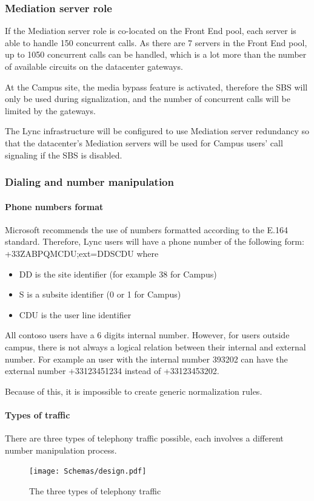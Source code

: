 \subsubsection{Mediation server role}
If the Mediation server role is co-located on the Front End pool, each server is able to handle 150 concurrent calls. As there are 7 servers in the Front End pool, up to 1050 concurrent calls can be handled, which is a lot more than the number of available circuits on the datacenter gateways.

At the Campus site, the media bypass feature is activated, therefore the SBS will only be used during signalization, and the number of concurrent calls will be limited by the gateways.

The Lync infrastructure will be configured to use Mediation server redundancy so that the datacenter's Mediation servers will be used for Campus users' call signaling if the SBS is disabled.

\subsubsection{Dialing and number manipulation}
	\paragraph{Phone numbers format}
	Microsoft recommends the use of numbers formatted according to the E.164 standard. Therefore, Lync users will have a phone number of the following form: +33ZABPQMCDU;ext=DDSCDU where
	\begin{itemize}
		\item DD is the site identifier (for example 38 for Campus)
		\item S is a subsite identifier (0 or 1 for Campus)
		\item CDU is the user line identifier
	\end{itemize}
	
	All contoso users have a 6 digits internal number. However, for users outside campus, there is not always a logical relation between their internal and external number. For example an user with the internal number 393202 can have the external number +33123451234 instead of +33123453202.
	
	Because of this, it is impossible to create generic normalization rules.
	
	
	\paragraph{Types of traffic}
	There are three types of telephony traffic possible, each involves a different number manipulation process.
	\begin{figure}[H]
		\centering
		\texttt{[image: Schemas/design.pdf]}
		\caption{The three types of telephony traffic}
		\label{fig:case_traffic_types}
	\end{figure}
	
